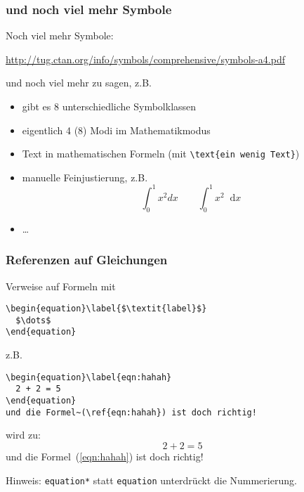 \begin{frame}[fragile]
  \frametitle{und noch viel mehr Symbole}

  \onslide<+->

  Noch viel mehr Symbole:

  \begin{center}
    \hbox{\url{http://tug.ctan.org/info/symbols/comprehensive/symbols-a4.pdf}}
  \end{center}

  \vspace*{-\baselineskip}

  \onslide<+->

  und noch viel mehr zu sagen, z.B.
  \begin{itemize}
  \item<+-> gibt es 8 unterschiedliche Symbolklassen
  \item<+-> eigentlich 4 (8) Modi im Mathematikmodus
  \item<+-> Text in mathematischen Formeln (mit \lstinline!\text{ein wenig Text}!)
  \item<+-> manuelle Feinjustierung, z.B.
    \begin{equation*}
      \int_0^1x^2dx \qquad \int_0^1 x^2 \mathop{} \mathrm{d}x
    \end{equation*}
  \item<+-> \ldots
  \end{itemize}

\end{frame}

\begin{frame}[fragile]
  \frametitle{Referenzen auf Gleichungen}

  \onslide<+->

  Verweise auf Formeln mit

\begin{lstlisting}
\begin{equation}\label{$\textit{label}$}
  $\dots$
\end{equation}
\end{lstlisting}

  z.B.

\begin{lstlisting}
\begin{equation}\label{eqn:hahah}
  2 + 2 = 5
\end{equation}
und die Formel~(\ref{eqn:hahah}) ist doch richtig!
\end{lstlisting}

  wird zu:
  \begin{equation}\label{eqn:hahah}
    2 + 2 = 5
  \end{equation}
  und die Formel~(\ref{eqn:hahah}) ist doch richtig!

  \onslide<+->

  Hinweis: \texttt{equation*} statt \texttt{equation} unterdrückt die Nummerierung.

\end{frame}

